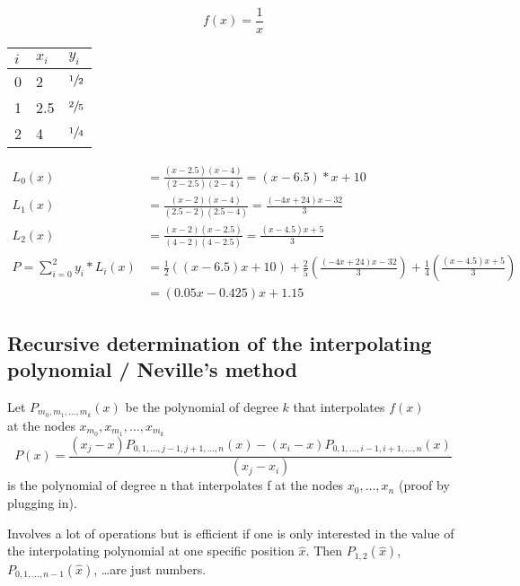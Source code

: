 \begin{example}
    \begin{equation*}
        f(x)= \frac{1}{x}
    \end{equation*}
    \begin{center}
        \begin{tabular}{l l l}
            \toprule
            $i$ & $x_i$ & $y_i$          \\
            \midrule
            0   & 2     & $\sfrac{1}{2}$ \\
            1   & 2.5   & $\sfrac{2}{5}$ \\
            2   & 4     & $\sfrac{1}{4}$ \\
            \bottomrule
        \end{tabular}
    \end{center}

    \begin{align*}
        L_0(x) &= \frac{(x-2.5)(x-4)}{(2-2.5)(2-4)}=(x-6.5)*x+10\\
        L_1(x) &= \frac{(x-2)(x-4)}{(2.5-2)(2.5-4)}=\frac{(-4x+24)x-32}{3}\\
        L_2(x) &= \frac{(x-2)(x-2.5)}{(4-2)(4-2.5)}= \frac{(x-4.5)x+5}{3}\\
        P=\sum_{i=0}^{2}y_i*L_i(x) &= \frac{1}{2}((x-6.5)x+10)+ \frac{2}{5}
        \left( \frac{(-4x+24)x-32}{3} \right)+\frac{1}{4}\left( \frac{(x-4.5)x+5}{3} \right)\\
        &=(0.05x-0.425)x+1.15
    \end{align*}
\end{example}

\subsection{Recursive determination of the interpolating polynomial / Neville's method}\label{subsec:recursive-determination-of-the-interpolating-polynomial-/-neville's-method}
Let $P_{m_0, m_1, \dots, m_k} (x)$ be the polynomial of degree $k$ that interpolates $f(x)$\\
at the nodes $x_{m_0}, x_{m_1},\ldots,x_{m_k}$
\begin{equation*}
    P(x)= \frac{(x_j-x)P_{0,1,\ldots, j-1, j+1, \ldots, n}(x)-(x_i-x)P_{0,1,\ldots, i-1, i+1, \ldots, n}(x)}{(x_j-x_i)}
\end{equation*}
is the polynomial of degree n that interpolates f at the nodes $x_0, \ldots, x_n$ (proof by plugging in).

Involves a lot of operations but is efficient if one is only interested in the value of the interpolating polynomial at one specific position $\hat{x}$.
Then $P_{1,2}(\hat{x})$, $P_{0,1,\ldots, n-1}(\hat{x})$, \ldots are just numbers.

